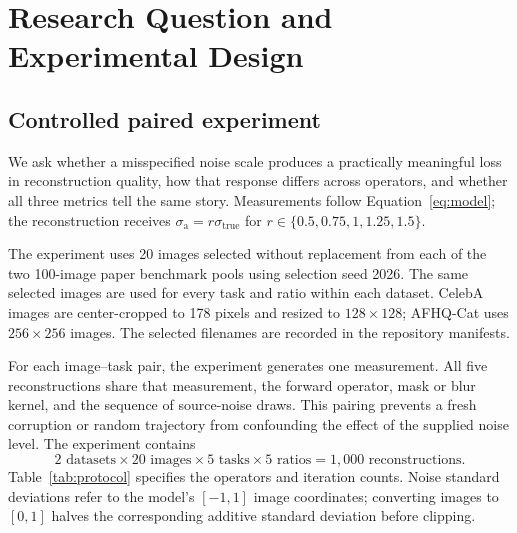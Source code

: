 \documentclass[10pt,letterpaper]{article}
\newcommand{\sa}{\sigma_{\mathrm a}}
\newcommand{\st}{\sigma_{\mathrm{true}}}
\begin{document}
\section{Research Question and Experimental Design}
\subsection{Controlled paired experiment}
We ask whether a misspecified noise scale produces a practically meaningful loss in reconstruction quality, how that response differs across operators, and whether all three metrics tell the same story. Measurements follow Equation~\eqref{eq:model}; the reconstruction receives $\sa=r\st$ for $r\in\{0.5,0.75,1,1.25,1.5\}$.

The experiment uses 20 images selected without replacement from each of the two 100-image paper benchmark pools using selection seed 2026. The same selected images are used for every task and ratio within each dataset. CelebA images are center-cropped to 178 pixels and resized to $128\times128$; AFHQ-Cat uses $256\times256$ images. The selected filenames are recorded in the repository manifests.

For each image--task pair, the experiment generates one measurement. All five reconstructions share that measurement, the forward operator, mask or blur kernel, and the sequence of source-noise draws. This pairing prevents a fresh corruption or random trajectory from confounding the effect of the supplied noise level. The experiment contains
\begin{equation}
 2\text{ datasets}\times20\text{ images}\times5\text{ tasks}\times5\text{ ratios}
 =1{,}000\text{ reconstructions}.
\end{equation}
Table~\ref{tab:protocol} specifies the operators and iteration counts. Noise standard deviations refer to the model's $[-1,1]$ image coordinates; converting images to $[0,1]$ halves the corresponding additive standard deviation before clipping.
\end{document}
